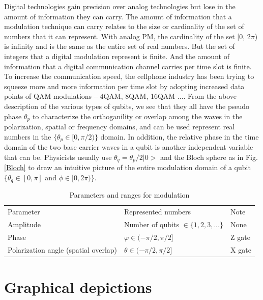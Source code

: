 \documentclass{book}
\begin{document}
Digital technologies gain precision over analog technologies but lose in the amount of information they can carry. The amount of information that a modulation technique can carry relates to the size or cardinality of the set of numbers that it can represent. With analog PM, the cardinality of the set [0, 2$\pi$) is infinity and is the same as the entire set of real numbers. But the set of integers that a digital modulation represent is finite. And the amount of information that a digital communication channel carries per time slot is finite. To increase the communication speed, the cellphone industry has been trying to squeeze more and more information per time slot by adopting increased data points of QAM modulations -- 4QAM, 8QAM, 16QAM ....
From the above description of the various types of qubits, we see that they all have the pseudo phase $\theta_p$ to characterize the 
orthoganility or overlap among the waves in the polarization, spatial or frequency domains, and can be used represent real numbers in the $\{\theta_p \in [0, \pi/2)\}$ domain. In addition, the relative phase in the time domain of the two base carrier waves in a qubit is another independent variable that can be. Physicists usually use $\theta_q = \theta_p/2 |0>$ and the Bloch sphere as in Fig. \ref{Bloch} to draw an intuitive picture of the entire modulation domain of a qubit $\{\theta_q \in [0, \pi]$ and $\phi \in [0, 2\pi)\}$.

\begin{table}[]
\caption{Parameters and ranges for modulation}
\label{modulation-parameters}
\begin{tabular}{lll}
Parameter &Represented numbers &Note                 \\
Amplitude &Number of qubits $\in \{1, 2, 3, ...\}$   & None \\
Phase & $\varphi \in (-\pi /2, \pi /2] $& Z gate \\
Polarization angle (spatial overlap) & $\theta \in (-\pi /2, \pi /2]$ &X gate
\end{tabular}
\end{table}

\section{Graphical depictions}
\end{document}
